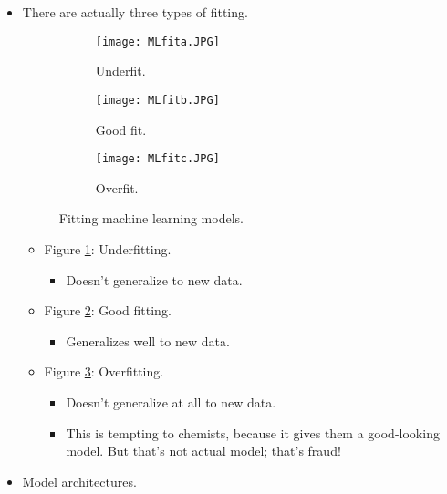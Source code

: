 \documentclass[../notes.tex]{subfiles}
\begin{document}
\begin{itemize}
\begin{itemize}
        \item See Figure \ref{fig:MLfitc}.
    \end{itemize}
    \item There are actually three types of fitting.
    \begin{figure}[h!]
        \centering
        \begin{subfigure}[b]{0.3\linewidth}
            \centering
            \texttt{[image: MLfita.JPG]}
            \caption{Underfit.}
            \label{fig:MLfita}
        \end{subfigure}
        \begin{subfigure}[b]{0.3\linewidth}
            \centering
            \texttt{[image: MLfitb.JPG]}
            \caption{Good fit.}
            \label{fig:MLfitb}
        \end{subfigure}
        \begin{subfigure}[b]{0.3\linewidth}
            \centering
            \texttt{[image: MLfitc.JPG]}
            \caption{Overfit.}
            \label{fig:MLfitc}
        \end{subfigure}
        \caption{Fitting machine learning models.}
        \label{fig:MLfit}
    \end{figure}
    \begin{itemize}
        \item Figure \ref{fig:MLfita}: Underfitting.
        \begin{itemize}
            \item Doesn't generalize to new data.
        \end{itemize}
        \item Figure \ref{fig:MLfitb}: Good fitting.
        \begin{itemize}
            \item Generalizes well to new data.
        \end{itemize}
        \item Figure \ref{fig:MLfitc}: Overfitting.
        \begin{itemize}
            \item Doesn't generalize at all to new data.
            \item This is tempting to chemists, because it gives them a good-looking model. But that's not actual model; that's fraud!
        \end{itemize}
    \end{itemize}
    \item Model architectures.

\end{itemize}
\end{document}
